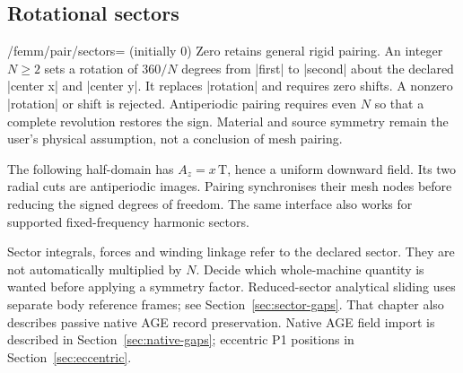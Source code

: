 \subsection{Rotational sectors}
\begin{key}{/femm/pair/sectors= (initially 0)}
  Zero retains general rigid pairing. An integer $N\geq2$ sets a rotation of
  $360/N$ degrees from |first| to |second| about the declared |center x| and
  |center y|. It replaces |rotation| and requires zero shifts. A nonzero
  |rotation| or shift is rejected. Antiperiodic pairing requires even $N$ so
  that a complete revolution restores the sign. Material and source symmetry
  remain the user's physical assumption, not a conclusion of mesh pairing.
\end{key}

The following half-domain has $A_z=x\,\mathrm{T}$, hence a uniform downward
field. Its two radial cuts are antiperiodic images. Pairing synchronises their
mesh nodes before reducing the signed degrees of freedom. The same interface
also works for supported fixed-frequency harmonic sectors.

\begin{codeexample}[width=5cm]
\end{codeexample}

Sector integrals, forces and winding linkage refer to the declared sector.
They are not automatically multiplied by $N$. Decide which whole-machine
quantity is wanted before applying a symmetry factor. Reduced-sector analytical sliding uses separate body reference frames;
see Section~\ref{sec:sector-gaps}. That chapter also describes passive native
AGE record preservation. Native AGE field import is described in
Section~\ref{sec:native-gaps}; eccentric P1 positions in Section~\ref{sec:eccentric}.

